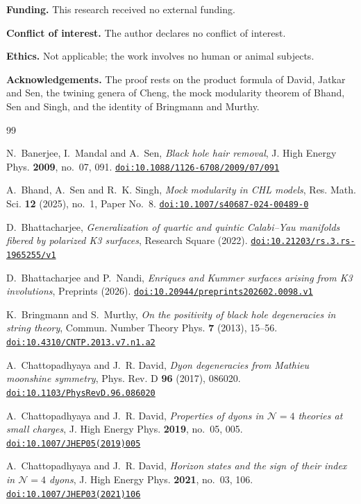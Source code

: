 \documentclass[11pt]{amsart}
\theoremstyle{definition}
\newcommand{\doi}[1]{\href{https://doi.org/#1}{\nolinkurl{doi:#1}}}
\begin{document}
\smallskip\noindent\textbf{Funding.} This research received no external funding.

\smallskip\noindent\textbf{Conflict of interest.} The author declares no conflict of interest.

\smallskip\noindent\textbf{Ethics.} Not applicable; the work involves no human or animal subjects.

\smallskip\noindent\textbf{Acknowledgements.} The proof rests on the product formula of David, Jatkar and Sen, the twining genera of Cheng, the mock modularity theorem of Bhand, Sen and Singh, and the identity of Bringmann and Murthy.

\begin{thebibliography}{99}\small

 N.~Banerjee, I.~Mandal and A.~Sen, \emph{Black hole hair removal}, J. High Energy Phys. \textbf{2009}, no.~07, 091. \doi{10.1088/1126-6708/2009/07/091}

 A.~Bhand, A.~Sen and R.~K. Singh, \emph{Mock modularity in CHL models}, Res. Math. Sci. \textbf{12} (2025), no.~1, Paper No.~8. \doi{10.1007/s40687-024-00489-0}

 D.~Bhattacharjee, \emph{Generalization of quartic and quintic Calabi--Yau manifolds fibered by polarized K3 surfaces}, Research Square (2022). \doi{10.21203/rs.3.rs-1965255/v1}

 D.~Bhattacharjee and P.~Nandi, \emph{Enriques and Kummer surfaces arising from K3 involutions}, Preprints (2026). \doi{10.20944/preprints202602.0098.v1}

 K.~Bringmann and S.~Murthy, \emph{On the positivity of black hole degeneracies in string theory}, Commun. Number Theory Phys. \textbf{7} (2013), 15--56. \doi{10.4310/CNTP.2013.v7.n1.a2}

 A.~Chattopadhyaya and J.~R. David, \emph{Dyon degeneracies from Mathieu moonshine symmetry}, Phys. Rev. D \textbf{96} (2017), 086020. \doi{10.1103/PhysRevD.96.086020}

 A.~Chattopadhyaya and J.~R. David, \emph{Properties of dyons in $\mathcal N=4$ theories at small charges}, J. High Energy Phys. \textbf{2019}, no.~05, 005. \doi{10.1007/JHEP05(2019)005}

 A.~Chattopadhyaya and J.~R. David, \emph{Horizon states and the sign of their index in $\mathcal N=4$ dyons}, J. High Energy Phys. \textbf{2021}, no.~03, 106. \doi{10.1007/JHEP03(2021)106}


\end{thebibliography}
\end{document}
